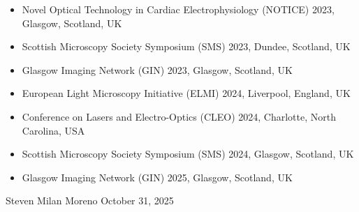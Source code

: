 \begin{itemize}
    \item Novel Optical Technology in Cardiac Electrophysiology (NOTICE) 2023, Glasgow, Scotland, UK
    \item Scottish Microscopy Society Symposium (SMS) 2023, Dundee, Scotland, UK
    \item Glasgow Imaging Network (GIN) 2023, Glasgow, Scotland, UK
    \item European Light Microscopy Initiative (ELMI) 2024, Liverpool, England, UK
    \item Conference on Lasers and Electro-Optics (CLEO) 2024, Charlotte, North Carolina, USA
    \item Scottish Microscopy Society Symposium (SMS) 2024, Glasgow, Scotland, UK
    \item Glasgow Imaging Network (GIN) 2025, Glasgow, Scotland, UK
\end{itemize}
\medskip
\medskip
\medskip
Steven Milan Moreno
October 31, 2025